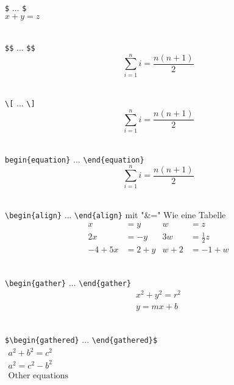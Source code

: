 	\clearpage
	\noindent\hrulefill \\
	\verb|$| ... \verb|$| \\
	$x+y=z$
	
	\noindent\hrulefill \\
	\verb|$$| ... \verb|$$|
	$$\sum_{i=1}^{n} i = \frac{n(n+1)}{2}$$
	
	\noindent\hrulefill \\
	\verb|\[| ... \verb|\]|
	\[\sum_{i=1}^{n} i = \frac{n(n+1)}{2} \tag{5}\]
	
	\noindent\hrulefill \\
	\verb|begin{equation}| ... \verb|\end{equation}|
	\begin{equation}
	\sum_{i=1}^{n} i = \frac{n(n+1)}{2}
	\end{equation}
	
	\noindent\hrulefill \\
	\verb|\begin{align}| ... \verb|\end{align}| mit "\&=" Wie eine Tabelle
	\begin{align*}
		x &= y           &  w &= z               \\
		2x &= -y         &  3w &= \frac{1}{2}z   \\
		-4 + 5x &= 2+y   &  w+2 &= -1+w
	\end{align*}
	
	\noindent\hrulefill \\
	\verb|\begin{gather}| ... \verb|\end{gather}|
	\begin{gather}
	x^2 + y^2 = r^2 \\
	y = mx + b
	\end{gather}
	
	\noindent\hrulefill \\
	\verb|$\begin{gathered}| ... \verb|\end{gathered}$| \\
	$
	\begin{gathered}
	a^2 + b^2 = c^2 \\
	a^2 = c^2 - b^2 \\
	\text{Other equations}
	\end{gathered}
	$
	
